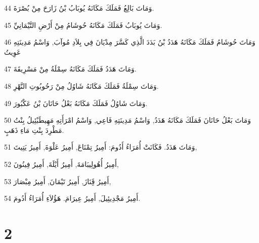 \par 44 وَمَاتَ بَالِعُ فَمَلَكَ مَكَانَهُ يُوبَابُ بْنُ زَارَحَ مِنْ بُصْرَةَ.
\par 45 وَمَاتَ يُوبَابُ فَمَلَكَ مَكَانَهُ حُوشَامُ مِنْ أَرْضِ التَّيْمَانِيِّ.
\par 46 وَمَاتَ حُوشَامُ فَمَلَكَ مَكَانَهُ هَدَدُ بْنُ بَدَدَ الَّذِي كَسَّرَ مِدْيَانَ فِي بِلاَدِ مُوآبَ, وَاسْمُ مَدِينَتِهِ عَوِيتُ
\par 47 وَمَاتَ هَدَدُ فَمَلَكَ مَكَانَهُ سِمْلَةُ مِنْ مَسْرِيقَةَ.
\par 48 وَمَاتَ سِمْلَةُ فَمَلَكَ مَكَانَهُ شَاوُلُ مِنْ رَحُوبُوتِ النَّهْرِ.
\par 49 وَمَاتَ شَاوُلُ فَمَلَكَ مَكَانَهُ بَعْلُ حَانَانَ بْنُ عَكْبُورَ.
\par 50 وَمَاتَ بَعْلُ حَانَانَ فَمَلَكَ مَكَانَهُ هَدَدُ, وَاسْمُ مَدِينَتِهِ فَاعِي, وَاسْمُ امْرَأَتِهِ مَهِيطَبْئِيلُ بِنْتُ مَطْرِدَ بِنْتِ مَاءِ ذَهَبٍ.
\par 51 وَمَاتَ هَدَدُ. فَكَانَتْ أُمَرَاءُ أَدُومَ: أَمِيرُ تِمْنَاعَ, أَمِيرُ عَلْوَةَ, أَمِيرُ يَتِيتَ,
\par 52 أَمِيرُ أُهُولِيبَامَةَ, أَمِيرُ أَيْلَةَ, أَمِيرُ فِينُونَ,
\par 53 أَمِيرُ قَِنَازَ, أَمِيرُ تَيْمَانَ, أَمِيرُ مِبْصَارَ,
\par 54 أَمِيرُ مَجْدِيئِيلَ, أَمِيرُ عِيرَامَ. هَؤُلاَءِ أُمَرَاءُ أَدُومَ.

\chapter{2}

